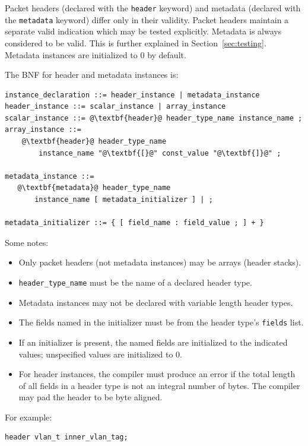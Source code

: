 \documentclass[12pt]{article}
\begin{document}
Packet headers (declared with the \texttt{header} keyword) and metadata (declared 
with the \texttt{metadata} keyword) differ only in their validity. Packet headers 
maintain a separate valid indication which may be tested explicitly. Metadata 
is always considered to be valid. This is further explained in 
Section~\ref{sec:testing}.  Metadata instances are 
initialized to 0 by default.

The BNF for header and metadata instances is:

\begin{lstlisting}[frame=single,backgroundcolor=\color{bnfgreen},escapechar=\@]
instance_declaration ::= header_instance | metadata_instance
header_instance ::= scalar_instance | array_instance
scalar_instance ::= @\textbf{header}@ header_type_name instance_name ;
array_instance ::=
    @\textbf{header}@ header_type_name 
        instance_name "@\textbf{[}@" const_value "@\textbf{]}@" ;

metadata_instance ::= 
   @\textbf{metadata}@ header_type_name
       instance_name [ metadata_initializer ] | ;

metadata_initializer ::= { [ field_name : field_value ; ] + }
\end{lstlisting}


Some notes:

\begin{itemize}
\item
Only packet headers (not metadata instances) may be arrays (header stacks).
\item
\texttt{header_type_name} must be the name of a declared header type.
\item
Metadata instances may not be declared with variable length header types.
\item
The fields named in the initializer must be from the header type's \texttt{fields} list.
\item
If an initializer is present, the named fields are initialized to the indicated 
values; unspecified values are initialized to 0.
\item
For header instances, the compiler must produce an error if the total length 
of all fields in a header type is not an integral number of bytes. The compiler 
may pad the header to be byte aligned.
\end{itemize}


For example:

\begin{lstlisting}[keywords={},frame=single,escapechar=\@]
header vlan_t inner_vlan_tag;
\end{lstlisting}
\end{document}
